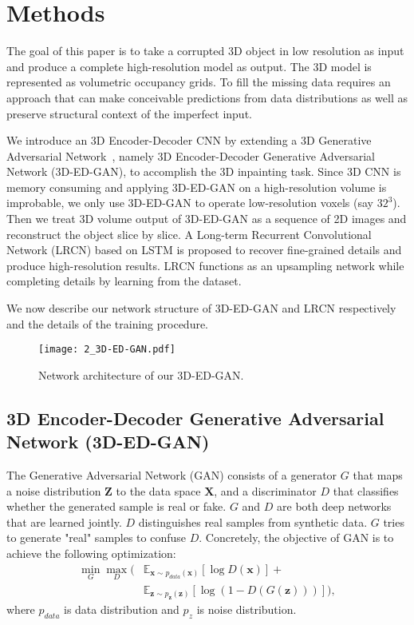 \documentclass[10pt,twocolumn,letterpaper]{article}
\begin{document}
\section{Methods}

The goal of this paper is to take a corrupted 3D object in low resolution as input and produce a complete high-resolution model as output. The 3D model is represented as volumetric occupancy grids. To fill the missing data requires an approach that can make conceivable predictions from data distributions as well as preserve structural context of the imperfect input. 

We introduce an 3D Encoder-Decoder CNN by extending a 3D Generative Adversarial Network~\cite{3dgan}, namely 3D Encoder-Decoder Generative Adversarial Network (3D-ED-GAN), to accomplish the 3D inpainting task. Since 3D CNN is memory consuming and applying 3D-ED-GAN on a high-resolution volume is improbable, we only use 3D-ED-GAN to operate low-resolution voxels (say $32^3$). Then we treat 3D volume output of 3D-ED-GAN as a sequence of 2D images and reconstruct the object slice by slice. A Long-term Recurrent Convolutional Network (LRCN) based on LSTM is proposed to recover fine-grained details and produce high-resolution results. LRCN functions as an upsampling network while completing details by learning from the dataset. 

We now describe our network structure of 3D-ED-GAN and LRCN respectively and the details of the training procedure.

\begin{figure}[t]
    \texttt{[image: 2\_3D-ED-GAN.pdf]}
    \caption{Network architecture of our 3D-ED-GAN.}
    \label{fig:EDGAN}
\end{figure}
\subsection{3D Encoder-Decoder Generative Adversarial Network (3D-ED-GAN)}

The Generative Adversarial Network (GAN) consists of a generator $G$ that maps a noise distribution $\mathbf{Z}$ to the data space $\mathbf{X}$, and a discriminator $D$ that classifies whether the generated sample is real or fake. $G$ and $D$ are both deep networks that are learned jointly. $D$ distinguishes real samples from synthetic data. $G$ tries to generate "real" samples to confuse $D$. Concretely, the objective of GAN is to achieve the following optimization:
  \begin{align}
\min_{G} \max_{D}  ( &\mathbb{E}_{\mathbf{x} \sim p_{data}(\mathbf{x})}[\log D(\mathbf{x})]+ \nonumber\\
&\mathbb{E}_{\mathbf{z} \sim p_{\mathbf{z}}(\mathbf{z})}[\log (1-D(G(\mathbf{z})))]), \label{eq:gan}
  \end{align}
where $p_{data}$ is data distribution and $p_{z}$ is noise distribution.
\end{document}
